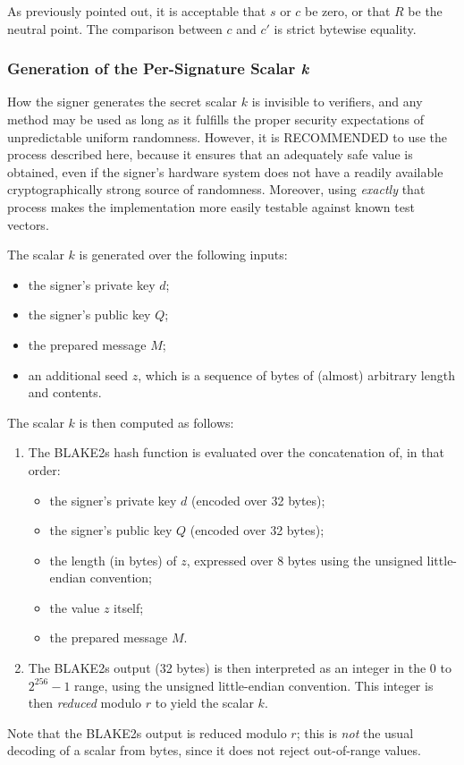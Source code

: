 \documentclass{llncs}
\begin{document}
As previously pointed out, it is acceptable that $s$ or $c$ be zero,
or that $R$ be the neutral point. The comparison between $c$ and $c'$
is strict bytewise equality.

\subsubsection{Generation of the Per-Signature Scalar \emph{k}}\label{sec:sign-genk}

How the signer generates the secret scalar $k$ is invisible to
verifiers, and any method may be used as long as it fulfills the proper
security expectations of unpredictable uniform randomness. However, it
is RECOMMENDED to use the process described here, because it ensures
that an adequately safe value is obtained, even if the signer's hardware
system does not have a readily available cryptographically strong source
of randomness. Moreover, using \emph{exactly} that process makes the
implementation more easily testable against known test vectors.

The scalar $k$ is generated over the following inputs:
\begin{itemize}

    \item the signer's private key $d$;
    \item the signer's public key $Q$;
    \item the prepared message $M$;
    \item an additional seed $z$, which is a sequence of bytes of (almost)
    arbitrary length and contents.

\end{itemize}
The scalar $k$ is then computed as follows:
\begin{enumerate}

    \item The BLAKE2s hash function is evaluated over the concatenation
    of, in that order:
    \begin{itemize}

        \item the signer's private key $d$ (encoded over 32 bytes);
        \item the signer's public key $Q$ (encoded over 32 bytes);
        \item the length (in bytes) of $z$, expressed over 8 bytes
        using the unsigned little-endian convention;
        \item the value $z$ itself;
        \item the prepared message $M$.

    \end{itemize}

    \item The BLAKE2s output (32 bytes) is then interpreted as an integer
    in the $0$ to $2^{256}-1$ range, using the unsigned little-endian
    convention. This integer is then \emph{reduced} modulo $r$ to yield
    the scalar $k$.

\end{enumerate}
Note that the BLAKE2s output is reduced modulo $r$; this is \emph{not}
the usual decoding of a scalar from bytes, since it does not reject
out-of-range values.
\end{document}
